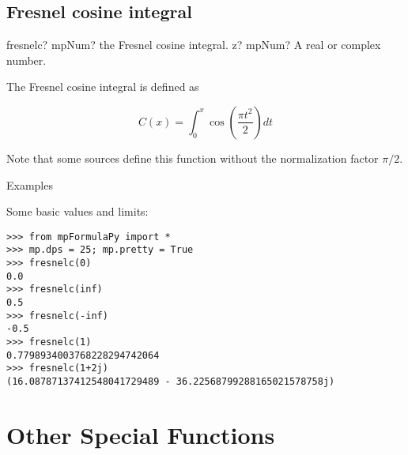 \subsection{Fresnel cosine integral}

\begin{mpFunctionsExtract}
	\mpFunctionOne
	{fresnelc? mpNum? the Fresnel cosine integral.}
	{z? mpNum? A real or complex number.}
\end{mpFunctionsExtract}

The Fresnel cosine integral is defined as

\begin{equation}
C(x) = \int_0^x \cos\left(\frac{\pi t^2}{2}  \right) dt
\end{equation}



Note that some sources define this function without the normalization factor $\pi/2$.

\vpara
Examples

Some basic values and limits:

\begin{lstlisting}
>>> from mpFormulaPy import *
>>> mp.dps = 25; mp.pretty = True
>>> fresnelc(0)
0.0
>>> fresnelc(inf)
0.5
>>> fresnelc(-inf)
-0.5
>>> fresnelc(1)
0.7798934003768228294742064
>>> fresnelc(1+2j)
(16.08787137412548041729489 - 36.22568799288165021578758j)
\end{lstlisting}



\newpage
\section{Other Special Functions}

%
%
%
%
%
%
%


